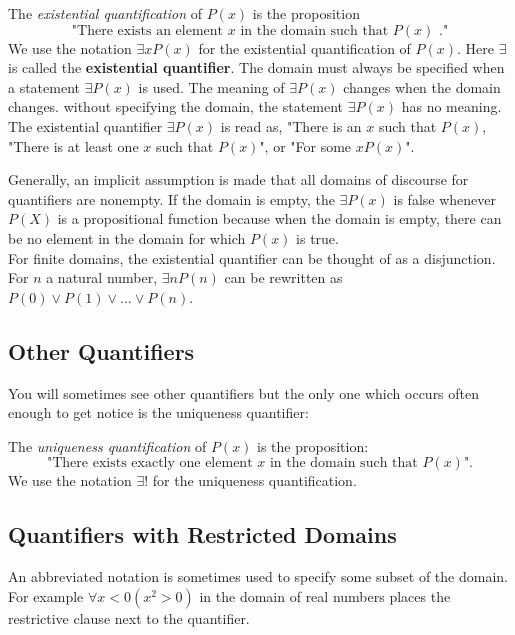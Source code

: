 \begin{definition}
The \textit{existential quantification} of $P(x)$ is the proposition
$$\text{"There exists an element }x \text{ in the domain such that } P(x) \text{ ."}$$
We use the notation $\exists x P(x)$ for the existential quantification of $P(x)$. Here $\exists$ is called the \textbf{existential quantifier}.
The domain must always be specified when a statement $\exists P(x)$ is used. The meaning of $\exists P(x)$ changes when the domain changes. without specifying the domain, the statement $\exists P(x)$ has no meaning. The existential quantifier $\exists P(x)$ is read as, "There is an $x$ such that $P(x)$, "There is at least one $x$ such that $P(x)$", or "For some $x P(x)$".
\end{definition}

\begin{notes}
Generally, an implicit assumption is made that all domains of discourse for quantifiers are nonempty. If the domain is empty, the $\exists P(x)$ is false whenever $P(X)$ is a propositional function because when the domain is empty, there can be no element in the domain for which $P(x)$ is true.\\

For finite domains, the existential quantifier can be thought of as a disjunction. For $n$ a natural number, $\exists n P(n)$ can be rewritten as $P(0) \lor P(1) \lor \dots \lor P(n)$.
\end{notes}

    \subsection {Other Quantifiers}
You will sometimes see other quantifiers but the only one which occurs often enough to get notice is the uniqueness quantifier:

\begin{definition}
The \textit{uniqueness quantification} of $P(x)$ is the proposition:
$$\text{"There exists exactly one element }x \text{ in the domain such that }P(x)\text{".}$$
We use the notation $\exists !$ for the uniqueness quantification.
\end{definition}

    \subsection {Quantifiers with Restricted Domains}
An abbreviated notation is sometimes used to specify some subset of the domain. For example $\forall x <0 (x^2 >0)$ in the domain of real numbers places the restrictive clause next to the quantifier.

